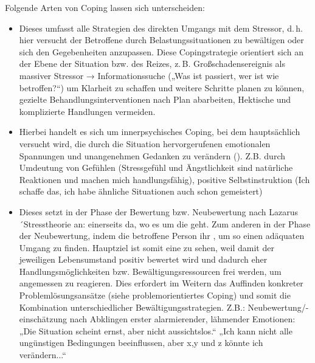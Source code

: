 {Folgende Arten von Coping lassen sich unterscheiden\cite{ZimbardoPsych6}:

\begin{itemize}
  \item {}
  Dieses umfasst alle Strategien des direkten Umgangs mit dem
  Stressor, d.\,h. hier versucht der Betroffene durch
   Belastungssituationen zu
  bewältigen oder sich den Gegebenheiten anzupassen. Diese
  Copingstrategie orientiert sich an der Ebene der Situation
  bzw. des Reizes, z.\,B. Großschadensereignis als massiver Stressor → Informationssuche („Was ist passiert, wer ist wie betroffen?“) um Klarheit zu schaffen und weitere Schritte planen zu können, gezielte Behandlungsinterventionen nach Plan abarbeiten, Hektische und komplizierte Handlungen vermeiden.
  \item {}
  Hierbei handelt es sich um innerpsychisches Coping, bei dem
  hauptsächlich versucht wird, die durch die Situation
  hervorgerufenen emotionalen Spannungen und unangenehmen
  Gedanken zu verändern (). Z.B. durch Umdeutung von 
  Gefühlen (Stressgefühl und Ängstlichkeit sind natürliche Reaktionen und 
  machen mich handlungsfähig), positive Selbstinstruktion (Ich schaffe das, ich 
  habe ähnliche Situationen auch schon gemeistert)
  \item {}
  Dieses setzt in der Phase der Bewertung bzw. Neubewertung
  nach Lazarus´Stresstheorie an: einerseits da, wo es um die
   geht. Zum anderen in der Phase
  der Neubewertung, indem die betroffene Person ihr
  , um so
  einen adäquaten Umgang zu finden. Hauptziel ist somit eine
   zu sehen, weil damit
  der jeweiligen Lebensumstand positiv bewertet wird und
  dadurch eher Handlungsmöglichkeiten bzw.
  Bewältigungsressourcen frei werden, um angemessen zu
  reagieren. Dies erfordert im Weitern das Auffinden konkreter
  Problemlösungsansätze (siehe problemorientiertes Coping) und
  somit die Kombination unterschiedlicher
  Bewältigungsstrategien. Z.B.: Neubewertung/-einschätzung nach Abklingen erster alarmierender, lähmender Emotionen: „Die Situation scheint ernst, aber nicht aussichtslos.“ „Ich kann nicht alle ungünstigen Bedingungen beeinflussen, aber x,y und z könnte ich verändern...“
\end{itemize}

}
{}
{}
{}
{}




